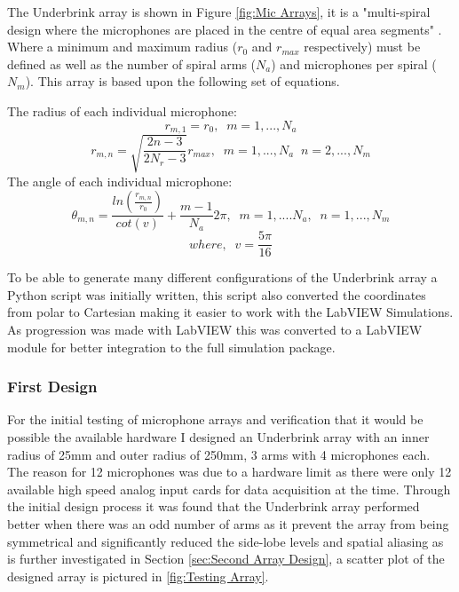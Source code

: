 \documentclass{UoNMCHA}
\numberwithin{equation}{section}
\begin{document}
    The Underbrink array is shown in Figure \ref{fig:Mic Arrays}, it is a "multi-spiral design where the microphones are placed in the centre of equal area segments" \citep{Pri13}. Where a minimum and maximum radius ($r_0$ and $r_{max}$ respectively) must be defined as well as the number of spiral arms ($N_a$) and microphones per spiral ($N_m$). This array is based upon the following set of equations.
    
    The radius of each individual microphone:
    \begin{equation}
        r_{m,1} = r_0,\;\;m=1,...,N_a
    \end{equation}
    \begin{equation*}
        r_{m,n}=\sqrt{\frac{2n-3}{2N_r-3}}r_{max},\;\;m=1,...,N_a\;\;n=2,...,N_m
    \end{equation*}
    The angle of each individual microphone:
    \begin{equation}
        \theta_{m,n} = \frac{ln(\frac{r_{m,n}}{r_0})}{cot(v)} + \frac{m-1}{N_a}2\pi,\;\;m=1,....N_a,\;\;n=1,...,N_m
    \end{equation}
    \begin{equation*}
        where,\;\;v=\frac{5\pi}{16}
    \end{equation*}
    
    To be able to generate many different configurations of the Underbrink array a Python script was initially written, this script also converted the coordinates from polar to Cartesian making it easier to work with the LabVIEW Simulations. As progression was made with LabVIEW this was converted to a LabVIEW module for better integration to the full simulation package. 
\subsubsection{First Design} \label{sec:First Array Design}
    For the initial testing of microphone arrays and verification that it would be possible the available hardware I designed an Underbrink array with an inner radius of 25mm and outer radius of 250mm, 3 arms with 4 microphones each. The reason for 12 microphones was due to a hardware limit as there were only 12 available high speed analog input cards for data acquisition at the time. Through the initial design process it was found that the Underbrink array performed better when there was an odd number of arms as it prevent the array from being symmetrical and significantly reduced the side-lobe levels and spatial aliasing as is further investigated in Section \ref{sec:Second Array Design}, a scatter plot of the designed array is pictured in \ref{fig:Testing Array}.
    
\end{document}

